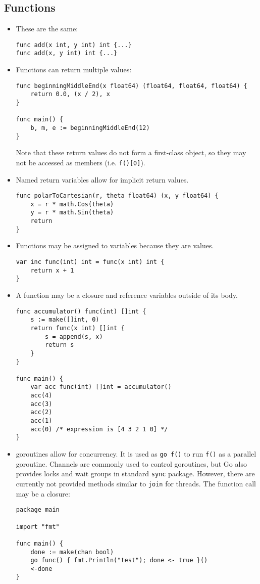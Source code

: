 \documentclass[12pt]{article}
\begin{document}
\subsection{Functions}
\begin{itemize}
    \item These are the same:
        \begin{verbatim}
func add(x int, y int) int {...} 
func add(x, y int) int {...}
        \end{verbatim}
    \item Functions can return multiple values:
        \begin{verbatim}
func beginningMiddleEnd(x float64) (float64, float64, float64) {
    return 0.0, (x / 2), x
}

func main() {
    b, m, e := beginningMiddleEnd(12)
}
        \end{verbatim}
        Note that these return values do not form a first-class object,
        so they may not be accessed as members (i.e. \texttt{f()[0]}).
    \item Named return variables allow for implicit return values.
        \begin{verbatim}
func polarToCartesian(r, theta float64) (x, y float64) {
    x = r * math.Cos(theta)
    y = r * math.Sin(theta)
    return
}
        \end{verbatim}

    \item Functions may be assigned to variables because they are values.
        \begin{verbatim}
var inc func(int) int = func(x int) int {
    return x + 1
}
        \end{verbatim}
    \item A function may be a closure and reference variables outside of its
    body. 
        \begin{verbatim}
func accumulator() func(int) []int {
    s := make([]int, 0)
    return func(x int) []int {
        s = append(s, x)
        return s
    }
}

func main() {
    var acc func(int) []int = accumulator()
    acc(4)
    acc(3)
    acc(2)
    acc(1)
    acc(0) /* expression is [4 3 2 1 0] */
}
        \end{verbatim}

    \item goroutines allow for concurrency. It is used as \texttt{go f()}
        to run \texttt{f()} as a parallel goroutine. Channels are commonly
        used to control goroutines, but Go also provides locks and wait groups
        in standard \texttt{sync} package. However, there are currently not
        provided methods similar to \texttt{join} for threads. The function
        call may be a closure:
        \begin{verbatim}
package main

import "fmt"

func main() {
    done := make(chan bool)
    go func() { fmt.Println("test"); done <- true }()
    <-done
}
        \end{verbatim}

\end{itemize}
\end{document}
